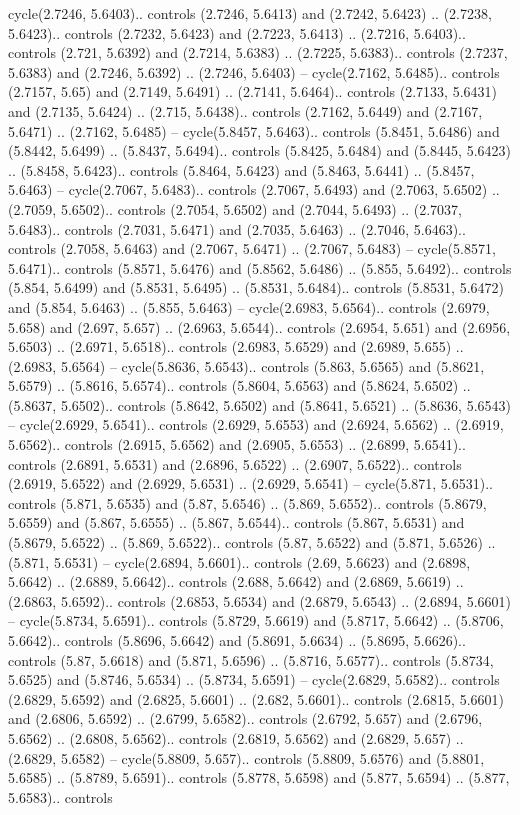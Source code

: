 cycle(2.7246, 5.6403).. controls (2.7246, 5.6413) and (2.7242, 5.6423) .. (2.7238, 5.6423).. controls (2.7232, 5.6423) and (2.7223, 5.6413) .. (2.7216, 5.6403).. controls (2.721, 5.6392) and (2.7214, 5.6383) .. (2.7225, 5.6383).. controls (2.7237, 5.6383) and (2.7246, 5.6392) .. (2.7246, 5.6403) -- cycle(2.7162, 5.6485).. controls (2.7157, 5.65) and (2.7149, 5.6491) .. (2.7141, 5.6464).. controls (2.7133, 5.6431) and (2.7135, 5.6424) .. (2.715, 5.6438).. controls (2.7162, 5.6449) and (2.7167, 5.6471) .. (2.7162, 5.6485) -- cycle(5.8457, 5.6463).. controls (5.8451, 5.6486) and (5.8442, 5.6499) .. (5.8437, 5.6494).. controls (5.8425, 5.6484) and (5.8445, 5.6423) .. (5.8458, 5.6423).. controls (5.8464, 5.6423) and (5.8463, 5.6441) .. (5.8457, 5.6463) -- cycle(2.7067, 5.6483).. controls (2.7067, 5.6493) and (2.7063, 5.6502) .. (2.7059, 5.6502).. controls (2.7054, 5.6502) and (2.7044, 5.6493) .. (2.7037, 5.6483).. controls (2.7031, 5.6471) and (2.7035, 5.6463) .. (2.7046, 5.6463).. controls (2.7058, 5.6463) and (2.7067, 5.6471) .. (2.7067, 5.6483) -- cycle(5.8571, 5.6471).. controls (5.8571, 5.6476) and (5.8562, 5.6486) .. (5.855, 5.6492).. controls (5.854, 5.6499) and (5.8531, 5.6495) .. (5.8531, 5.6484).. controls (5.8531, 5.6472) and (5.854, 5.6463) .. (5.855, 5.6463) -- cycle(2.6983, 5.6564).. controls (2.6979, 5.658) and (2.697, 5.657) .. (2.6963, 5.6544).. controls (2.6954, 5.651) and (2.6956, 5.6503) .. (2.6971, 5.6518).. controls (2.6983, 5.6529) and (2.6989, 5.655) .. (2.6983, 5.6564) -- cycle(5.8636, 5.6543).. controls (5.863, 5.6565) and (5.8621, 5.6579) .. (5.8616, 5.6574).. controls (5.8604, 5.6563) and (5.8624, 5.6502) .. (5.8637, 5.6502).. controls (5.8642, 5.6502) and (5.8641, 5.6521) .. (5.8636, 5.6543) -- cycle(2.6929, 5.6541).. controls (2.6929, 5.6553) and (2.6924, 5.6562) .. (2.6919, 5.6562).. controls (2.6915, 5.6562) and (2.6905, 5.6553) .. (2.6899, 5.6541).. controls (2.6891, 5.6531) and (2.6896, 5.6522) .. (2.6907, 5.6522).. controls (2.6919, 5.6522) and (2.6929, 5.6531) .. (2.6929, 5.6541) -- cycle(5.871, 5.6531).. controls (5.871, 5.6535) and (5.87, 5.6546) .. (5.869, 5.6552).. controls (5.8679, 5.6559) and (5.867, 5.6555) .. (5.867, 5.6544).. controls (5.867, 5.6531) and (5.8679, 5.6522) .. (5.869, 5.6522).. controls (5.87, 5.6522) and (5.871, 5.6526) .. (5.871, 5.6531) -- cycle(2.6894, 5.6601).. controls (2.69, 5.6623) and (2.6898, 5.6642) .. (2.6889, 5.6642).. controls (2.688, 5.6642) and (2.6869, 5.6619) .. (2.6863, 5.6592).. controls (2.6853, 5.6534) and (2.6879, 5.6543) .. (2.6894, 5.6601) -- cycle(5.8734, 5.6591).. controls (5.8729, 5.6619) and (5.8717, 5.6642) .. (5.8706, 5.6642).. controls (5.8696, 5.6642) and (5.8691, 5.6634) .. (5.8695, 5.6626).. controls (5.87, 5.6618) and (5.871, 5.6596) .. (5.8716, 5.6577).. controls (5.8734, 5.6525) and (5.8746, 5.6534) .. (5.8734, 5.6591) -- cycle(2.6829, 5.6582).. controls (2.6829, 5.6592) and (2.6825, 5.6601) .. (2.682, 5.6601).. controls (2.6815, 5.6601) and (2.6806, 5.6592) .. (2.6799, 5.6582).. controls (2.6792, 5.657) and (2.6796, 5.6562) .. (2.6808, 5.6562).. controls (2.6819, 5.6562) and (2.6829, 5.657) .. (2.6829, 5.6582) -- cycle(5.8809, 5.657).. controls (5.8809, 5.6576) and (5.8801, 5.6585) .. (5.8789, 5.6591).. controls (5.8778, 5.6598) and (5.877, 5.6594) .. (5.877, 5.6583).. controls 